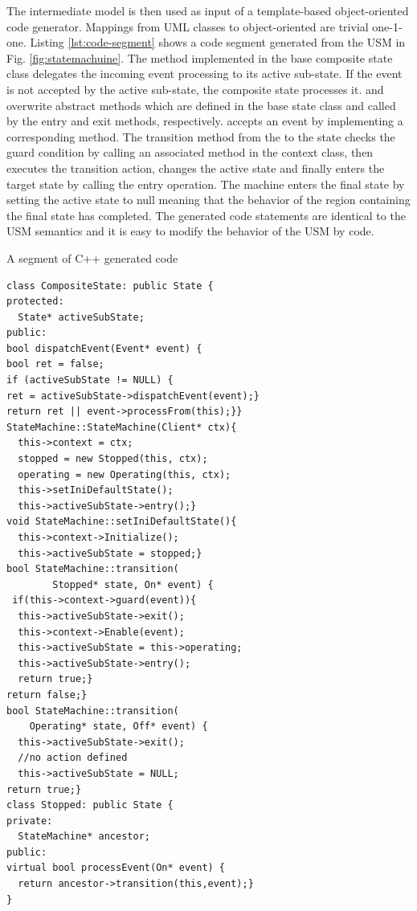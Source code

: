 The intermediate model is then used as input of a template-based object-oriented code generator. Mappings from UML classes to object-oriented are trivial one-1-one. Listing \ref{lst:code-segment} shows a code segment generated from the USM in Fig. \ref{fig:statemachuine}. The  method implemented in the base composite state class delegates the incoming event processing to its active sub-state. If the event is not accepted by the active sub-state, the composite state processes it.  and  overwrite abstract methods which are defined in the base state class and called by the entry and exit methods, respectively.  accepts an  event by implementing a corresponding  method. The transition method from the  to the  state checks the guard condition by calling an associated method in the context class, then executes the transition action, changes the active state and finally enters the target state by calling the entry operation. The machine enters the final state by setting the active state to null meaning that the behavior of the region containing the final state has completed. The generated code statements are identical to the USM semantics and it is easy to modify the behavior of the USM by code. %


\begin{algorithm}[tbp]
\caption{A segment of C++ generated code \label{lst:code-segment}}
\lstset{language=C++}
\begin{lstlisting}
class CompositeState: public State {
protected:
  State* activeSubState;
public:
bool dispatchEvent(Event* event) {
bool ret = false;
if (activeSubState != NULL) {
ret = activeSubState->dispatchEvent(event);}
return ret || event->processFrom(this);}}
StateMachine::StateMachine(Client* ctx){
  this->context = ctx;
  stopped = new Stopped(this, ctx);
  operating = new Operating(this, ctx);
  this->setIniDefaultState();
  this->activeSubState->entry();}
void StateMachine::setIniDefaultState(){
  this->context->Initialize();
  this->activeSubState = stopped;}
bool StateMachine::transition(
        Stopped* state, On* event) {
 if(this->context->guard(event)){
  this->activeSubState->exit();
  this->context->Enable(event);
  this->activeSubState = this->operating;
  this->activeSubState->entry();
  return true;}
return false;}
bool StateMachine::transition(
    Operating* state, Off* event) {
  this->activeSubState->exit();
  //no action defined
  this->activeSubState = NULL;
return true;}
class Stopped: public State {
private:
  StateMachine* ancestor;
public: 
virtual bool processEvent(On* event) {
  return ancestor->transition(this,event);}
}
\end{lstlisting}
\end{algorithm}


